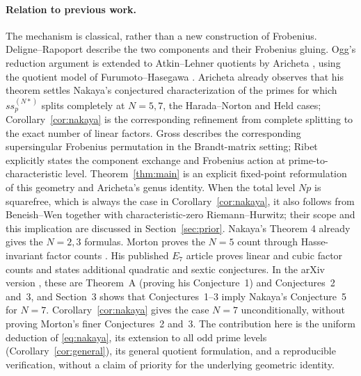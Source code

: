 \documentclass[11pt,a4paper]{article}
\theoremstyle{remark}\newtheorem{remark}[theorem]{Remark}
\numberwithin{equation}{section}
\begin{document}
\paragraph{Relation to previous work.}
The mechanism is classical, rather than a new construction of Frobenius. Deligne--Rapoport \cite[VI, Theorem 6.9]{DR} describe the two components and their Frobenius gluing. Ogg's reduction argument \cite{OggRed} is extended to Atkin--Lehner quotients by Aricheta \cite[Theorem 3.1]{Aricheta}, using the quotient model of Furumoto--Hasegawa \cite[Section 5]{FH}. Aricheta already observes \cite[Section 1]{Aricheta} that his theorem settles Nakaya's conjectured characterization of the primes for which $ss_p^{(N*)}$ splits completely at $N=5,7$, the Harada--Norton and Held cases; Corollary~\ref{cor:nakaya} is the corresponding refinement from complete splitting to the exact number of linear factors. Gross \cite[Proposition 2.7(3)]{Gross} describes the corresponding supersingular Frobenius permutation in the Brandt-matrix setting; Ribet \cite[Proposition 3.8(i), p.~446]{Ribet} explicitly states the component exchange and Frobenius action at prime-to-characteristic level. Theorem~\ref{thm:main} is an explicit fixed-point reformulation of this geometry and Aricheta's genus identity. When the total level $Np$ is squarefree, which is always the case in Corollary~\ref{cor:nakaya}, it also follows from Beneish--Wen \cite[Theorem 6.5]{BW} together with characteristic-zero Riemann--Hurwitz; their scope and this implication are discussed in Section~\ref{sec:prior}. Nakaya's Theorem 4 already gives the $N=2,3$ formulas. Morton proves the $N=5$ count through Hasse-invariant factor counts \cite{Morton5a,Morton5b}. His published $E_7$ article \cite{Morton7} proves linear and cubic factor counts and states additional quadratic and sextic conjectures. In the arXiv version \cite{Morton7arXiv}, these are Theorem~A (proving his Conjecture~1) and Conjectures~2 and~3, and Section~3 shows that Conjectures~1--3 imply Nakaya's Conjecture~5 for $N=7$. Corollary~\ref{cor:nakaya} gives the case $N=7$ unconditionally, without proving Morton's finer Conjectures~2 and~3. The contribution here is the uniform deduction of \eqref{eq:nakaya}, its extension to all odd prime levels (Corollary~\ref{cor:general}), its general quotient formulation, and a reproducible verification, without a claim of priority for the underlying geometric identity.
\end{document}
